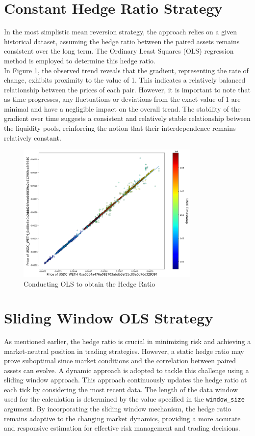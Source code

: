 \section{Constant Hedge Ratio Strategy}
In the most simplistic mean reversion strategy, the approach relies on a given historical dataset, assuming the hedge ratio between the paired assets remains consistent over the long term. The Ordinary Least Squares (OLS) regression method is employed to determine this hedge ratio.
\\[3mm]
In Figure \ref{fig:f1}, the observed trend reveals that the gradient, representing the rate of change, exhibits proximity to the value of 1. This indicates a relatively balanced relationship between the prices of each pair. However, it is important to note that as time progresses, any fluctuations or deviations from the exact value of 1 are minimal and have a negligible impact on the overall trend. The stability of the gradient over time suggests a consistent and relatively stable relationship between the liquidity pools, reinforcing the notion that their interdependence remains relatively constant.
\begin{figure}[!htb]
    \centering
    \includegraphics[width=0.8\textwidth]{project/Images/simple_hedge_ratio.png}
    \caption{Conducting OLS to obtain the Hedge Ratio \label{fig:f1}}
\end{figure}

\section{Sliding Window OLS Strategy}
As mentioned earlier, the hedge ratio is crucial in minimizing risk and achieving a market-neutral position in trading strategies. However, a static hedge ratio may prove suboptimal since market conditions and the correlation between paired assets can evolve. A dynamic approach is adopted to tackle this challenge using a sliding window approach. This approach continuously updates the hedge ratio at each tick by considering the most recent data. The length of the data window used for the calculation is determined by the value specified in the \texttt{window\_size} argument. By incorporating the sliding window mechanism, the hedge ratio remains adaptive to the changing market dynamics, providing a more accurate and responsive estimation for effective risk management and trading decisions.

